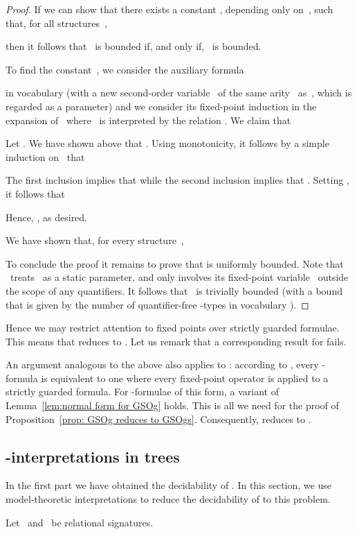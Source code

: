 \documentclass{LMCS}
\begin{document}
\begin{thm}
\begin{proof}
If we can show that there exists a constant , depending only on~,
such that, for all structures~,

then it follows that ~is bounded if, and only if, ~is bounded.

To find the constant~, we consider the auxiliary formula

in vocabulary 
(with a new second-order variable~ of the same arity~ as~,
which is regarded as a parameter) and
we consider its fixed-point induction in the expansion
 of~ where ~is interpreted by the relation .
We claim that


Let . We have shown above that
.
Using monotonicity, it follows by a simple induction on~ that

The first inclusion implies that  while
the second inclusion implies that .
Setting , it follows that

Hence, , as desired.

We have shown that, for every structure~,

To conclude the proof it remains to prove that  is uniformly bounded.
Note that ~treats~ as a static parameter, and only involves
its fixed-point variable~ outside the scope of any quantifiers.
It follows that ~is trivially bounded (with a bound that is given by
the number of quantifier-free -types in vocabulary ).
\end{proof}

Hence we may restrict attention
to fixed points over strictly guarded formulae.
This means that  reduces to .
Let us remark that a corresponding result for  fails.

An argument analogous to the above
also applies to \?: according to \cite{GHO},
every -formula is equivalent to one where
every fixed-point operator is applied to a
strictly guarded formula.
For -formulae of this form,
a variant of Lemma~\ref{lem:normal form for GSOg} holds.
This is all we need for the proof of Proposition~\ref{prop: GSOg reduces to GSOgs}.
Consequently,  reduces to .


\subsection{\boldmath -interpretations in trees}


In the first part we have obtained the decidability of .
In this section, we use model-theoretic interpretations to
reduce the decidability of  to this problem.

\begin{defi}
Let ~and~ be relational signatures.


\end{defi}
\end{thm}
\end{document}
